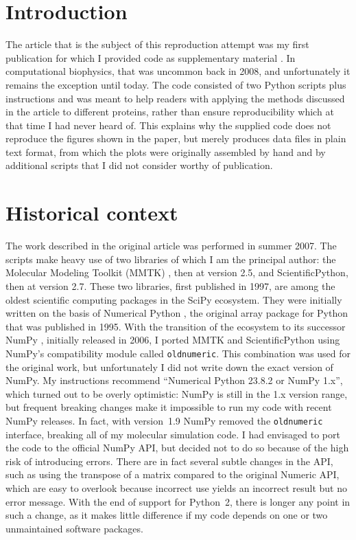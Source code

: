\section*{Introduction}

The article that is the subject of this reproduction attempt was my first publication for which I provided code as supplementary material \cite{HinsenStructuralflexibilityproteins2008}. In computational biophysics, that was uncommon back in 2008, and unfortunately it remains the exception until today. The code consisted of two Python scripts plus instructions and was meant to help readers with applying the methods discussed in the article to different proteins, rather than ensure reproducibility which at that time I had never heard of. This explains why the supplied code does not reproduce the figures shown in the paper, but merely produces data files in plain text format, from which the plots were originally assembled by hand and by additional scripts that I did not consider worthy of publication.

\section*{Historical context}

The work described in the original article was performed in summer 2007. The scripts make heavy use of two libraries of which I am the principal author: the Molecular Modeling Toolkit (MMTK) \cite{Hinsenmolecularmodelingtoolkit2000}, then at version 2.5, and ScientificPython, then at version 2.7. These two libraries, first published in 1997, are among the oldest scientific computing packages in the SciPy ecosystem. They were initially written on the basis of Numerical Python \cite{DuboisNumericalPython1996}, the original array package for Python that was published in 1995. With the transition of the ecosystem to its successor NumPy \cite{OliphantguideNumPy2006}, initially released in 2006, I ported MMTK and ScientificPython using NumPy's compatibility module called \texttt{oldnumeric}. This combination was used for the original work, but unfortunately I did not write down the exact version of NumPy. My instructions recommend ``Numerical Python 23.8.2 or NumPy 1.x'', which turned out to be overly optimistic: NumPy is still in the 1.x version range, but frequent breaking changes make it impossible to run my code with recent NumPy releases. In fact, with version~1.9 NumPy removed the \texttt{oldnumeric} interface, breaking all of my molecular simulation code. I had envisaged to port the code to the official NumPy API, but decided not to do so because of the high risk of introducing errors. There are in fact several subtle changes in the API, such as using the transpose of a matrix compared to the original Numeric API, which are easy to overlook because incorrect use yields an incorrect result but no error message. With the end of support for Python~2, there is longer any point in such a change, as it makes little difference if my code depends on one or two unmaintained software packages.

